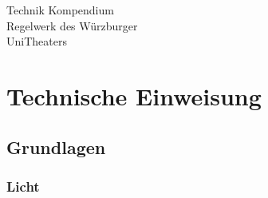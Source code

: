 \documentclass[a4paper]{article}
\begin{document}
\begin{small}
	\noindent
	
\end{small}
\bigskip

\begin{center}
	\LARGE Technik Kompendium \\
	\large Regelwerk des Würzburger\\ UniTheaters
\end{center}
\smallskip

\tableofcontents



\newpage



\newpage



\newpage



\newpage

\section{Technische Einweisung}
\subsection{Grundlagen}
\subsubsection{Licht}

\newpage



\end{document}
